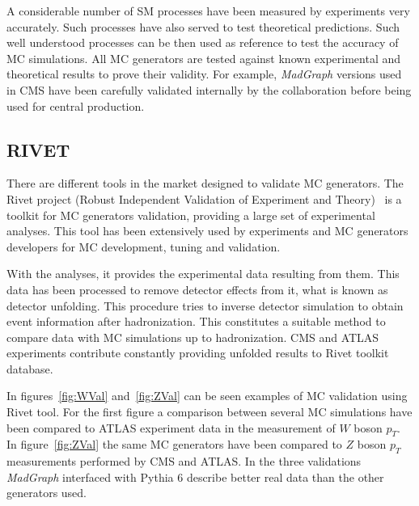 A considerable number of SM processes have been measured by experiments very accurately. Such processes have also served to test theoretical predictions. Such well understood processes can be then used as reference to test the accuracy of MC simulations. All MC generators are tested against known experimental and theoretical results to prove their validity. For example, \textit{MadGraph} versions used in CMS have been carefully validated internally by the collaboration before being used for central production.

\subsection{RIVET}
\label{sec:rivet}

There are different tools in the market designed to validate MC generators. The Rivet project (Robust Independent Validation of Experiment and Theory)~\cite{Buckley:2010ar} is a toolkit for MC generators validation, providing a large set of experimental analyses. This tool has been extensively used by experiments and MC generators developers for MC development, tuning and validation. 

With the analyses, it provides the experimental data resulting from them. This data has been processed to remove detector effects from it, what is known as detector unfolding. This procedure tries to inverse detector simulation to obtain event information after hadronization. This constitutes a suitable method to compare data with MC simulations up to hadronization. CMS and ATLAS experiments contribute constantly providing unfolded results to Rivet toolkit database.

In figures~\ref{fig:WVal} and~\ref{fig:ZVal} can be seen examples of MC validation using Rivet tool. For the first figure a comparison between several MC simulations have been compared to ATLAS experiment data in the measurement of $W$ boson $p_{T}$. In figure~\ref{fig:ZVal} the same MC generators have been compared to $Z$ boson $p_{T}$ measurements performed by CMS and ATLAS. In the three validations \textit{MadGraph} interfaced with Pythia 6 describe better real data than the other generators used. 

